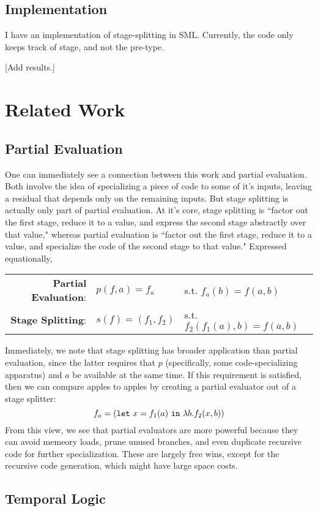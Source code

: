 \documentclass[11pt]{article}
\newcommand {\letin} [3] {{\tt let}~{#1} = {#2}~{\tt in}~{#3}}
\begin{document}
\subsection{Implementation}

I have an implementation of stage-splitting in SML.  Currently, the code only keeps track of stage, and not the pre-type.

[Add results.]

\section{Related Work}
\label{sec:lit}
\subsection{Partial Evaluation}
One can immediately see a connection between this work and partial evaluation. Both involve the idea of specializing a piece of code to some of it's inputs, leaving a residual that depends only on the remaining inputs.  But stage splitting is actually only part of partial evaluation.  At it's core, stage splitting is ``factor out the first stage, reduce it to a value, and express the second stage abstractly over that value," whereas partial evaluation is ``factor out the first stage, reduce it to a value, and specialize the code of the second stage to that value."  Expressed equationally,
\begin{center}
\begin{tabular}{rll}
{\bf Partial Evaluation}:& $p(f,a)=f_a$ &s.t. $f_a(b) = f(a,b)$ \\
{\bf Stage Splitting}:& $s(f)=(f_1,f_2)$ &s.t. $f_2(f_1(a),b) = f(a,b)$
\end{tabular}
\end{center}
Immediately, we note that stage splitting has broader application than partial evaluation, since the latter requires that $p$ (specifically, some code-specializing apparatus) and $a$ be available at the same time.  If this requirement is satisfied, then we can compare apples to apples by creating a partial evaluator out of a stage splitter:
	\[f_a = (\letin {x}{f_1(a)}{\lambda b.f_2(x,b)})\]
From this view, we see that partial evaluators are more powerful because they can avoid memeory loads, prune unused branches, and even duplicate recursive code for further specialization.  These are largely free wins, except for the recursive code generation, which might have large space costs.

\subsection{Temporal Logic}
\end{document}
